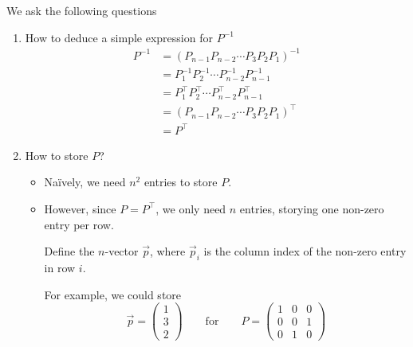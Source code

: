 \begin{remark}
    We ask the following questions
    \begin{enumerate}
        \item How to deduce a simple expression for \( P^{-1} \)
              \begin{align*}
                  P^{-1}
                   &
                  = ( P_{n-1} P_{n-2} \cdots P_3 P_2 P_1 )^{-1}
                  \\
                   & = P_1^{-1} P_2^{-1} \cdots P_{n-2}^{-1} P_{n-1}^{-1}
                  \\
                   & = P_1^\top P_2^\top \cdots P_{n-2}^\top P_{n-1}^\top
                  \\
                   & = ( P_{n-1} P_{n-2} \cdots P_3 P_2 P_1 )^\top
                  \\
                   & = P^\top
              \end{align*}

        \item How to store \( P \)?

              \begin{itemize}
                  \item Na\"ively, we need \( n^2 \) entries to store \( P \).

                  \item However, since \( P = P^\top \), we only need \( n \) entries, storying one non-zero entry per row.

                        Define the \( n \)-vector \( \vec{p} \), where \( \vec{p}_i \) is the column index of the non-zero entry in row \( i \).

                        For example, we could store \[
                            \vec{p} = \begin{pmatrix}
                                1 \\ 3 \\ 2
                            \end{pmatrix}
                            \qquad \text{for} \qquad
                            P = \begin{pmatrix}
                                1 & 0 & 0 \\ 0 & 0 & 1 \\ 0 & 1 & 0
                            \end{pmatrix}
                        \]
              \end{itemize}
    \end{enumerate}
\end{remark}

